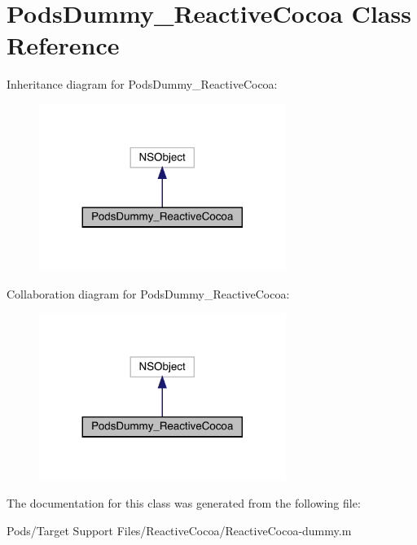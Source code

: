 \hypertarget{interface_pods_dummy___reactive_cocoa}{}\section{Pods\+Dummy\+\_\+\+Reactive\+Cocoa Class Reference}
\label{interface_pods_dummy___reactive_cocoa}


Inheritance diagram for Pods\+Dummy\+\_\+\+Reactive\+Cocoa\+:\nopagebreak
\begin{figure}[H]
\begin{center}
\leavevmode
\includegraphics[width=227pt]{interface_pods_dummy___reactive_cocoa__inherit__graph}
\end{center}
\end{figure}


Collaboration diagram for Pods\+Dummy\+\_\+\+Reactive\+Cocoa\+:\nopagebreak
\begin{figure}[H]
\begin{center}
\leavevmode
\includegraphics[width=227pt]{interface_pods_dummy___reactive_cocoa__coll__graph}
\end{center}
\end{figure}


The documentation for this class was generated from the following file\+:\begin{DoxyCompactItemize}
\item 
Pods/\+Target Support Files/\+Reactive\+Cocoa/Reactive\+Cocoa-\/dummy.\+m\end{DoxyCompactItemize}
